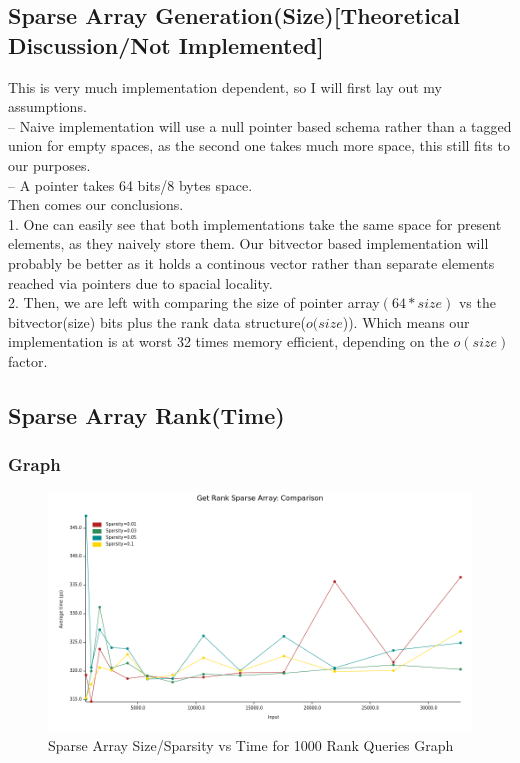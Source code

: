 \documentclass{report}
\begin{document}
\subsection*{Sparse Array Generation(Size)[Theoretical Discussion/Not Implemented]}
This is very much implementation dependent, so I will first lay out my assumptions. \\
-- Naive implementation will use a null pointer based schema rather than a tagged union for empty spaces, as the second one takes much more space, this still fits to our purposes. \\
-- A pointer takes 64 bits/8 bytes space. \\
Then comes our conclusions. \\
1. One can easily see that both implementations take the same space for present elements, as they naively store them. Our bitvector based implementation will probably be better as it holds a continous vector rather than separate elements reached via pointers due to spacial locality. \\
2. Then, we are left with comparing the size of pointer array$(64*size)$ vs the bitvector(size) bits plus the rank data structure($o(size$)). Which means our implementation is at worst 32 times memory efficient, depending on the $o(size)$ factor. \\


\newpage

\subsection*{Sparse Array Rank(Time)}
\subsubsection*{Graph}
\begin{figure}[h!]
    \centering
    \includegraphics[scale=0.5]{get_rank_size_vs_sparsity.png}
    \caption{Sparse Array Size/Sparsity vs Time for 1000 Rank Queries Graph}
    \label{fig:my_label}
\end{figure}
\end{document}
